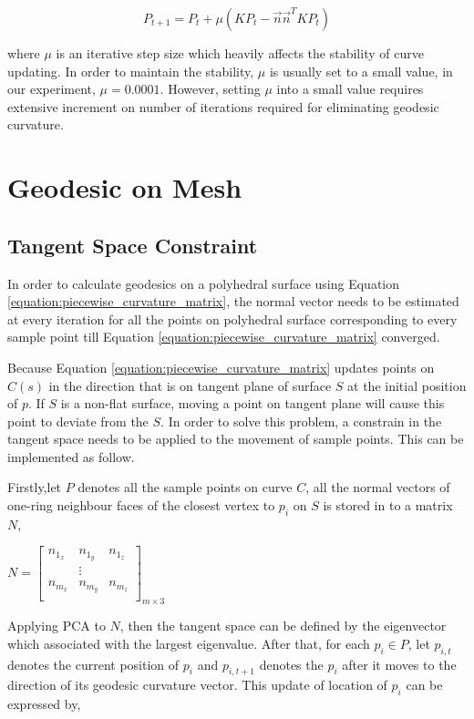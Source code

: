 \begin{equation}
P_{t+1} = P_{t}+\mu(KP_{t}-\vec{n}\vec{n}^{T}KP_{t})
\label{equation:piecewise_curvature_matrix}
\end{equation}

where $\mu$ is an iterative step size which heavily affects the stability of curve updating. In order to maintain the stability, $\mu$ is usually set to a small value, in our experiment, $\mu = 0.0001$. However, setting $\mu$ into a small value requires extensive increment on number of iterations required for eliminating geodesic curvature. 
\section{Geodesic on Mesh}

\subsection{Tangent Space Constraint}

In order to calculate geodesics on a polyhedral surface using Equation \ref{equation:piecewise_curvature_matrix}, the normal vector needs to be estimated at every iteration for all the points on polyhedral surface corresponding to every sample point till Equation \ref{equation:piecewise_curvature_matrix} converged.

Because Equation \ref{equation:piecewise_curvature_matrix} updates points on $C(s)$ in the direction that is on tangent plane of surface $S$ at the initial position of $p$. If $S$ is a non-flat surface, moving a point on tangent plane will cause this point to deviate from the $S$. In order to solve this problem, a constrain in the tangent space needs to be applied to the movement of sample points. This can be implemented as follow. 

Firstly,let $P$ denotes all the sample points on curve $C$, all the normal vectors of one-ring neighbour faces of the closest vertex to $p_{i}$ on $S$ is stored in to a matrix $N$,

$N=
\begin{bmatrix}
 	n_{1_{x}} &	n_{1_{y}} & n_{1_{z}}\\
 	& \vdots &\\	
 	n_{m_{x}} &	n_{m_{y}} & n_{m_{z}}\\
\end{bmatrix}_{m\times 3}
$

Applying PCA  to $N$, then the tangent space can be defined by the eigenvector which associated with the largest eigenvalue. After that, for each $p_{i} \in P$, let $p_{i,t}$ denotes the current position of $p_{i}$ and $p_{i,t+1}$ denotes the $p_{i}$ after it moves to the direction of its geodesic curvature vector. This update of location of $p_{i}$ can be expressed by,

